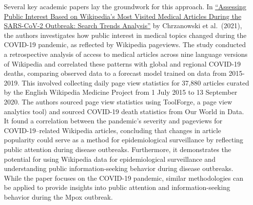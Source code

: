 \documentclass[
  letterpaper,
  DIV=11,
  numbers=noendperiod]{scrartcl}
\begin{document}
Several key academic papers lay the groundwork for this approach. In
\href{https://doi.org/10.2196/26331}{``Assessing Public Interest Based
on Wikipedia's Most Visited Medical Articles During the SARS-CoV-2
Outbreak: Search Trends Analysis''} by Chrzanowski et al.~(2021), the
authors investigates how public interest in medical topics changed
during the COVID-19 pandemic, as reflected by Wikipedia pageviews. The
study conducted a retrospective analysis of access to medical articles
across nine language versions of Wikipedia and correlated these patterns
with global and regional COVID-19 deaths, comparing observed data to a
forecast model trained on data from 2015-2019. This involved collecting
daily page view statistics for 37,880 articles curated by the English
Wikipedia Medicine Project from 1 July 2015 to 13 September 2020. The
authors sourced page view statistics using ToolForge, a page view
analytics tool) and sourced COVID-19 death statistics from Our World in
Data. It found a correlation between the pandemic's severity and
pageviews for COVID-19--related Wikipedia articles, concluding that
changes in article popularity could serve as a method for
epidemiological surveillance by reflecting public attention during
disease outbreaks. Furthermore, it demonstrates the potential for using
Wikipedia data for epidemiological surveillance and understanding public
information-seeking behavior during disease outbreaks. While the paper
focuses on the COVID-19 pandemic, similar methodologies can be applied
to provide insights into public attention and information-seeking
behavior during the Mpox outbreak.
\end{document}
